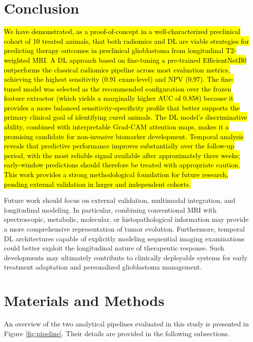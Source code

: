 \documentclass{article}
\begin{document}
\section{Conclusion}

{\hl{We have demonstrated, as a proof-of-concept in a well-characterized preclinical cohort of 10 treated animals, that both radiomics and DL are viable strategies for predicting therapy outcomes in preclinical glioblastoma from longitudinal T2-weighted MRI. A DL approach based on fine-tuning a pre-trained EfficientNetB0 outperforms the classical radiomics pipeline across most evaluation metrics, achieving the highest sensitivity (0.91 exam-level) and NPV (0.97). The fine-tuned model was selected as the recommended configuration over the frozen feature extractor (which yields a marginally higher AUC of 0.858) because it provides a more balanced sensitivity-specificity profile that better supports the primary clinical goal of identifying cured animals. The DL model's discriminative ability, combined with interpretable Grad-CAM attention maps, makes it a promising candidate for non-invasive biomarker development. Temporal analysis reveals that predictive performance improves substantially over the follow-up period, with the most reliable signal available after approximately three weeks; early-window predictions should therefore be treated with appropriate caution. This work provides a strong methodological foundation for future research, pending external validation in larger and independent cohorts.}}

Future work should focus on external validation, multimodal integration, and longitudinal modeling. In particular, combining conventional MRI with spectroscopic, metabolic, molecular, or histopathological information may provide a more comprehensive representation of tumor evolution. Furthermore, temporal DL architectures capable of explicitly modeling sequential imaging examinations could better exploit the longitudinal nature of therapeutic response. Such developments may ultimately contribute to clinically deployable systems for early treatment adaptation and personalized glioblastoma management.

\section{Materials and Methods}

An overview of the two analytical pipelines evaluated in this study is presented in Figure \ref{fig:pipeline}. Their details are provided in the following subsections.
\end{document}
